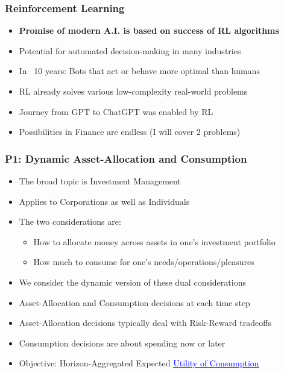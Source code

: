 \documentclass{beamer}
\begin{document}
\begin{frame}
\frametitle{Reinforcement Learning}
\pause
\begin{itemize}[<+->]

\item {\bf Promise of modern A.I. is based on success of RL algorithms}
\item Potential for automated decision-making in many industries
\item In ~10 years: Bots that act or behave more optimal than humans
\item RL already solves various low-complexity real-world problems
\item Journey from GPT to ChatGPT was enabled by RL
\item Possibilities in Finance are endless (I will cover 2 problems)
\end{itemize}
\end{frame}


\begin{frame}
\frametitle{P1: Dynamic Asset-Allocation and Consumption}
\pause
\begin{itemize}[<+->]
\item The broad topic is Investment Management
\item Applies to Corporations as well as Individuals
\item The two considerations are:
\pause
\begin{itemize}[<+->]
\item How to allocate money across assets in one's investment portfolio
\item How much to consume for one's needs/operations/pleasures
\end{itemize}
\item We consider the dynamic version of these dual considerations
\item Asset-Allocation and Consumption decisions at each time step
\item Asset-Allocation decisions typically deal with Risk-Reward tradeoffs
\item Consumption decisions are about spending now or later
\item Objective: Horizon-Aggregated Expected \href{https://github.com/coverdrive/technical-documents/blob/master/finance/cme241/Tour-UtilityTheory.pdf}{\underline{\textcolor{blue}{Utility of Consumption}}}
\end{itemize}
\end{frame}
\end{document}
